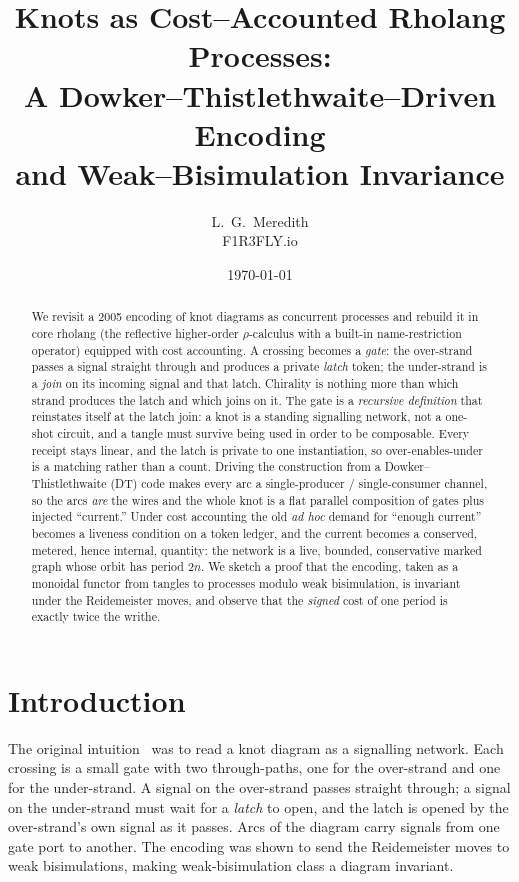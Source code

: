 \documentclass[11pt]{article}
\title{\bf Knots as Cost--Accounted Rholang Processes:\\
A Dowker--Thistlethwaite--Driven Encoding\\
and Weak--Bisimulation Invariance}
\author{L.~G.~Meredith\\ \small F1R3FLY.io}
\date{\today}
\theoremstyle{definition}
\begin{document}
\maketitle

\begin{abstract}
We revisit a 2005 encoding of knot diagrams as concurrent processes and rebuild
it in core rholang (the reflective higher-order $\rho$-calculus with a built-in
name-restriction operator) equipped with cost accounting. A crossing becomes a
\emph{gate}: the over-strand passes a signal straight through and produces a
private \emph{latch} token; the under-strand is a \emph{join} on its incoming
signal and that latch. Chirality is nothing more than which strand produces the
latch and which joins on it. The gate is a \emph{recursive definition} that
reinstates itself at the latch join: a knot is a standing signalling network, not
a one-shot circuit, and a tangle must survive being used in order to be
composable. Every receipt stays linear, and the latch is private to one
instantiation, so over-enables-under is a matching rather than a count. Driving
the construction from a
Dowker--Thistlethwaite (DT) code makes every arc a single-producer /
single-consumer channel, so the arcs \emph{are} the wires and the whole knot is a
flat parallel composition of gates plus injected ``current.'' Under cost
accounting the old \emph{ad hoc} demand for ``enough current'' becomes a liveness
condition on a token ledger, and the current becomes a conserved, metered, hence
internal, quantity: the network is a live, bounded, conservative marked graph
whose orbit has period $2n$. We sketch a proof that the encoding, taken as a
monoidal functor from tangles to processes modulo weak bisimulation, is invariant
under the Reidemeister moves, and observe that the \emph{signed} cost of one
period is exactly twice the writhe.
\end{abstract}

\section{Introduction}

The original intuition~\cite{knot2005} was to read a knot diagram as a signalling
network. Each crossing is a small gate with two through-paths, one for the
over-strand and one for the under-strand. A signal on the over-strand passes
straight through; a signal on the under-strand must wait for a \emph{latch} to
open, and the latch is opened by the over-strand's own signal as it passes. Arcs
of the diagram carry signals from one gate port to another. The encoding was
shown to send the Reidemeister moves to weak bisimulations, making
weak-bisimulation class a diagram invariant.
\end{document}
